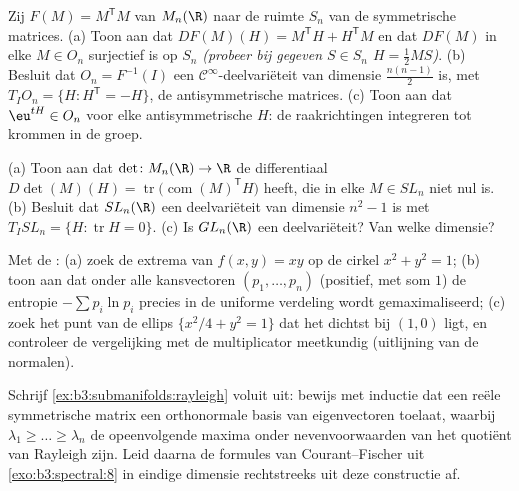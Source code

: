 \begin{exercise}[$\star\star$]\label{exo:b3:submanifolds:5}
Zij $F(M) = M^{\mathsf T}M$ van $M_n(\R)$ naar de ruimte $S_n$
van de symmetrische matrices.
(a) Toon aan dat $DF(M)(H) = M^{\mathsf T}H + H^{\mathsf T}M$ en
dat $DF(M)$ in elke $M \in O_n$ surjectief is op $S_n$
\emph{(probeer bij gegeven $S \in S_n$ $H = \frac12MS$)}.
(b) Besluit dat $O_n = F^{-1}(I)$ een  $\mathcal
C^\infty$-deelvariëteit van dimensie $\frac{n(n-1)}2$ is, met
$T_IO_n = \{H : H^{\mathsf T} = -H\}$, de antisymmetrische
matrices.
(c) Toon aan dat $\eu^{tH} \in O_n$ voor elke antisymmetrische
$H$: de raakrichtingen integreren tot krommen in de groep.
\end{exercise}

\begin{exercise}[$\star\star$]\label{exo:b3:submanifolds:6}
(a) Toon aan dat $\det \colon M_n(\R) \to \R$ de differentiaal
$D\det(M)(H) = \operatorname{tr}\bigl(\operatorname{com}(M)
^{\mathsf T}H\bigr)$ heeft, die in elke $M \in SL_n$ niet nul
is.
(b) Besluit dat $SL_n(\R)$ een deelvariëteit van dimensie $n^2 -
1$ is met $T_ISL_n = \{H : \operatorname{tr}H = 0\}$.
(c) Is $GL_n(\R)$ een deelvariëteit? Van welke dimensie?
\end{exercise}

\begin{exercise}[$\star\star$]\label{exo:b3:submanifolds:7}
Met de :
(a) zoek de extrema van $f(x,y) = xy$ op de cirkel $x^2 + y^2 =
1$;
(b) toon aan dat onder alle kansvectoren $(p_1, \dots, p_n)$
(positief, met som $1$) de entropie $-\sum p_i\ln p_i$ precies in
de uniforme verdeling wordt gemaximaliseerd;
(c) zoek het punt van de ellips $\{x^2/4 + y^2 = 1\}$ dat het
dichtst bij $(1, 0)$ ligt, en controleer de vergelijking met de
multiplicator meetkundig (uitlijning van de normalen).
\end{exercise}

\begin{exercise}[$\star\star\star$]\label{exo:b3:submanifolds:8}
Schrijf \cref{ex:b3:submanifolds:rayleigh} voluit uit: bewijs met
inductie dat een reële symmetrische matrix een orthonormale basis
van eigenvectoren toelaat, waarbij $\lambda_1 \geq \dots \geq
\lambda_n$ de opeenvolgende maxima onder nevenvoorwaarden van het
quotiënt van Rayleigh zijn. Leid daarna de formules van
Courant--Fischer uit \cref{exo:b3:spectral:8} in eindige dimensie
rechtstreeks uit deze constructie af.
\end{exercise}

